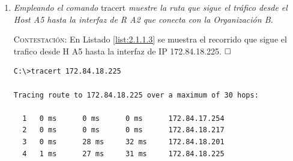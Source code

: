 \documentclass[twoside, 11pt]{article}
\begin{document}
\begin{enumerate}
\textsc{Contestación}: Fijándonos en las capturas del tráfico RIP en Listado \ref{list:2.1.1.2}, observamos que la primera actualización que envía R4 (por la interfaz Serial2/0) no contiene información relevante a la subred 172.84.16.0/23, precisamente porque el router que conecta con dicha interfaz es el que ha proporcionado la información. Las líneas 4 y 5 de la captura manifiestan este hecho. $\hfill\square$

\begin{center}
\begin{verbatim}
Ejecutado en R 4
Router#debug ip rip
RIP protocol debugging is on
RIP: received v2 update from 172.84.18.218 on Serial2/0
      172.84.16.0/23 via 0.0.0.0 in 1 hops
RIP: sending  v2 update to 224.0.0.9 via Serial2/0 (172.84.18.217)
RIP: build update entries
      172.84.18.0/25 via 0.0.0.0, metric 2, tag 0
      172.84.18.128/26 via 0.0.0.0, metric 2, tag 0
      172.84.18.192/30 via 0.0.0.0, metric 2, tag 0
      172.84.18.196/30 via 0.0.0.0, metric 2, tag 0
      172.84.18.200/30 via 0.0.0.0, metric 1, tag 0
      172.84.18.204/30 via 0.0.0.0, metric 2, tag 0
      172.84.18.208/30 via 0.0.0.0, metric 2, tag 0
      172.84.18.212/30 via 0.0.0.0, metric 1, tag 0
      172.84.18.220/30 via 0.0.0.0, metric 1, tag 0
      172.84.18.224/30 via 0.0.0.0, metric 3, tag 0
\end{verbatim}
\label{list:2.1.1.2}
\end{center}

\item \textit{Empleando el comando} tracert \textit{muestre la ruta que sigue el tráfico
desde el Host A5 hasta la
interfaz de R A2 que conecta con la Organización B.}
\label{ej:2.1.1.3}

\vspace{7px}

\textsc{Contestación}: En Listado \ref{list:2.1.1.3} se muestra el recorrido que sigue el trafico desde H A5 hasta la interfaz de IP 172.84.18.225. $\hfill\square$

\begin{center}
\begin{verbatim}
C:\>tracert 172.84.18.225

Tracing route to 172.84.18.225 over a maximum of 30 hops: 

  1   0 ms      0 ms      0 ms      172.84.17.254
  2   0 ms      0 ms      0 ms      172.84.18.217
  3   0 ms      28 ms     32 ms     172.84.18.201
  4   1 ms      27 ms     31 ms     172.84.18.225


\end{verbatim}
\end{center}
\end{enumerate}
\end{document}
